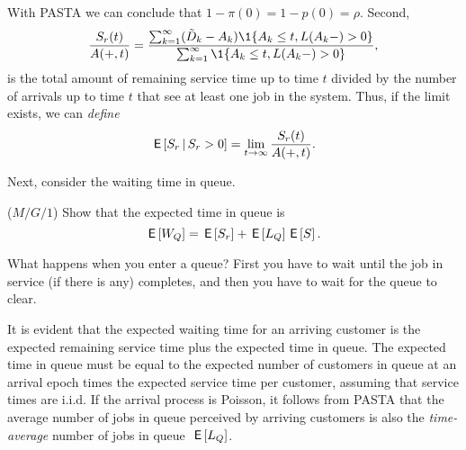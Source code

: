 \begin{exercise}
\begin{solution}
\begin{equation*}
\end{equation*}
With PASTA we can conclude that $1-\pi(0) = 1-p(0)= \rho$. Second,
\begin{equation*}
\frac{S_r(t)}{A(+,t)} 
= \frac{\sum_{k=1}^\infty (\tilde D_k - A_k) \1{A_k\leq t, L(A_k-) > 0}}{\sum_{k=1}^\infty \1{A_k\leq t, L(A_k-)>0}},
\end{equation*}
is the total amount of remaining service time up to time $t$ divided by
the number of arrivals up to time $t$ that see at least one job in the system. Thus, 
if the limit exists, we can \emph{define}
\begin{equation*}
\,\mathsf{E}\left[S_r \,\middle|\, S_r>0\right]  =\lim_{t\to\infty} \frac{S_r(t)}{A(+,t)}.
\end{equation*}
  \end{solution}
\end{exercise}

Next, consider the waiting time in queue.  
\begin{exercise}($M/G/1$)
Show  that the expected time in queue is
\begin{equation}\label{eq:24}
  \,\mathsf{E}\left[W_Q\right] = \,\mathsf{E}\left[S_r\right] + \,\mathsf{E}\left[L_Q\right] \,\mathsf{E}\left[S\right].
\end{equation}
\begin{hint}
  What happens when you enter a queue? First you have to wait until the job in service (if there is any) completes, and then you have to wait for the queue to clear.
\end{hint}
\begin{solution}
It is evident that the expected waiting time for an arriving customer is the expected
remaining service time plus the expected time in queue. The expected
time in queue  must be equal to the expected number of
customers in queue at an arrival epoch times the expected service time
per customer, assuming that service times are i.i.d. If the arrival
process is Poisson, it follows from PASTA that the average number of
jobs in queue perceived by arriving customers is also the
\emph{time-average} number of jobs in queue~$\,\mathsf{E}\left[L_Q\right]$.  
\end{solution}
\end{exercise}
 
